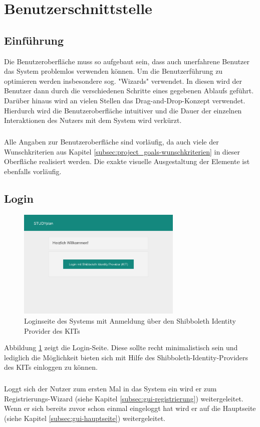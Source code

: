 \section{Benutzerschnittstelle}

\subsection{Einführung}
Die Benutzeroberfläche muss so aufgebaut sein, dass auch unerfahrene Benutzer das System problemlos verwenden können.
Um die Benutzerführung zu optimieren werden insbesondere sog. "Wizards" verwendet. In diesen wird der Benutzer dann durch die verschiedenen Schritte eines gegebenen Ablaufs geführt. Darüber hinaus wird an vielen Stellen das Drag-and-Drop-Konzept verwendet.
Hierdurch wird die Benutzeroberfläche intuitiver und die Dauer der einzelnen Interaktionen des Nutzers mit dem System wird verkürzt.
\subparagraph{}
Alle Angaben zur Benutzeroberfläche sind vorläufig, da auch viele der Wunschkriterien aus Kapitel \ref{subsec:project_goals-wunschkriterien} in dieser Oberfläche realisiert werden. Die exakte visuelle Ausgestaltung der Elemente ist ebenfalls vorläufig.
\subsection{Login}
\begin{figure}[!htb]
	\caption{Loginseite des Systems mit Anmeldung über den Shibboleth Identity Provider des KITs}
	\label{fig:gui-login-1}
	\centering
	\includegraphics[width=0.7\textwidth]{../GUI/ergebnisse/login-1.png}
\end{figure}
Abbildung \ref{fig:gui-login-1} zeigt die Login-Seite. Diese sollte recht minimalistisch sein und lediglich die Möglichkeit bieten sich mit Hilfe des Shibboleth-Identity-Providers des KITs einloggen zu können.
\subparagraph{}
Loggt sich der Nutzer zum ersten Mal in das System ein wird er zum Registrierungs-Wizard (siehe Kapitel \ref{subsec:gui-registrierung}) weitergeleitet. Wenn er sich bereits zuvor schon einmal eingeloggt hat wird er auf die Hauptseite (siehe Kapitel \ref{subsec:gui-hauptseite}) weitergeleitet.

